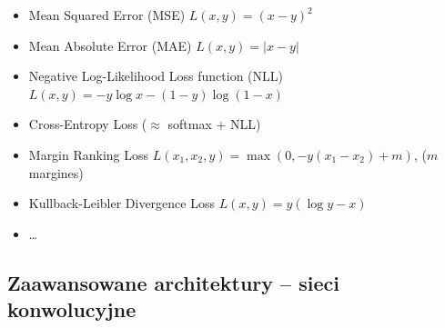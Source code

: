 \documentclass[11pt, xcolor={dvipsnames,svgnames},aspectratio=169]{beamer}
\theoremstyle{plain}
\begin{document}
\begin{frame}
	\begin{itemize}
		\item Mean Squared Error (MSE) $L(x,y) = (x - y)^2$
		\item Mean Absolute Error (MAE) $L(x,y) = |x - y|$
		\item Negative Log-Likelihood Loss function (NLL) $L(x,y) = -y\log x - (1 - y)\log (1 - x)$
		\item Cross-Entropy Loss ($\approx$ softmax + NLL)
		\item Margin Ranking Loss $L(x_1,x_2,y) = \max(0, -y(x_1 - x_2) + m)$, ($m$ margines)
		\item Kullback-Leibler Divergence Loss $L(x,y) = y(\log y - x)$
		\item \dots  
	\end{itemize}
\end{frame}


\subsection{Zaawansowane architektury -- sieci konwolucyjne}
\end{document}
